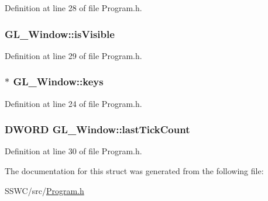 Definition at line 28 of file Program.\+h.

\hypertarget{struct_g_l___window_a6b7dc6064a91f6e7ebf071633f43f90d}{
\subsubsection[{is\+Visible}]{ G\+L\+\_\+\+Window\+::is\+Visible}}\label{struct_g_l___window_a6b7dc6064a91f6e7ebf071633f43f90d}


Definition at line 29 of file Program.\+h.

\hypertarget{struct_g_l___window_ad0eed98271ddbfb6ab6cf7f12d7b5d02}{
\subsubsection[{keys}]{$\ast$ G\+L\+\_\+\+Window\+::keys}}\label{struct_g_l___window_ad0eed98271ddbfb6ab6cf7f12d7b5d02}


Definition at line 24 of file Program.\+h.

\hypertarget{struct_g_l___window_af8068e4f9adf4515817a3d72a9cf0d03}{
\subsubsection[{last\+Tick\+Count}]{\setlength{\rightskip}{0pt plus 5cm}D\+W\+O\+R\+D G\+L\+\_\+\+Window\+::last\+Tick\+Count}}\label{struct_g_l___window_af8068e4f9adf4515817a3d72a9cf0d03}


Definition at line 30 of file Program.\+h.



The documentation for this struct was generated from the following file\+:\begin{DoxyCompactItemize}
\item 
S\+S\+W\+C/src/\hyperlink{_program_8h}{Program.\+h}\end{DoxyCompactItemize}
